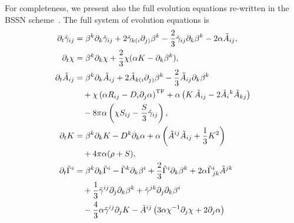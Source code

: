 For completeness, we present also the full evolution equations re-written in the BSSN scheme~\cite{Scalar_Shibata:1995we,Scalar_Baumgarte:1998te}.
The full system of evolution equations is
\begin{subequations}
  \allowdisplaybreaks
  \label{eq:bssn}
  \begin{align}
    \partial_t \tilde{\gamma}_{ij} & = \beta^k \partial_k \tilde{\gamma}_{ij} +
    2\tilde{\gamma}_{k(i} \partial_{j)} \beta^k - \frac{2}{3}
    \tilde{\gamma}_{ij} \partial_k \beta^k -2\alpha \tilde{A}_{ij},  \\
    \partial_t \chi & = \beta^k \partial_k \chi + \frac{2}{3} \chi (\alpha K
    - \partial_k \beta^k),  \\
    \partial_t \tilde{A}_{ij} & = \beta^k \partial_k \tilde{A}_{ij}
      + 2\tilde{A}_{k(i} \partial_{j)} \beta^k
      - \frac{2}{3} \tilde{A}_{ij} \partial_k \beta^k  \notag \\
      & \quad + \chi \left( \alpha R_{ij} - D_i \partial_j \alpha\right)^{\rm
      TF}
      + \alpha \left( K\,\tilde{A}_{ij}
      - 2 \tilde{A}_i{}^k \tilde{A}_{kj} \right) \notag \\
      & \quad - 8 \pi \alpha \left(
          \chi S_{ij} - \frac{S}{3} \tilde \gamma_{ij}
        \right), \\
    \partial_t K & = \beta^k \partial_k K - D^k \partial_k \alpha + \alpha \left(
                   \tilde{A}^{ij} \tilde{A}_{ij} + \frac{1}{3} K^2 \right) \notag \\
    & \quad  + 4 \pi \alpha (\rho + S), \\
    \partial_t \tilde{\Gamma}^i & = \beta^k \partial_k \tilde{\Gamma}^i
       - \tilde{\Gamma}^k \partial_k \beta^i + \frac{2}{3}
    \tilde{\Gamma}^i \partial_k \beta^k + 2 \alpha \tilde{\Gamma}^i_{jk}
                                  \tilde{A}^{jk} \notag \\
                                  & \quad + \frac{1}{3} \tilde{\gamma}^{ij}\partial_j \partial_k
    \beta^k
    + \tilde{\gamma}^{jk} \partial_j \partial_k \beta^i \nonumber \\
    & \quad - \frac{4}{3} \alpha \tilde{\gamma}^{ij} \partial_j K -
    \tilde{A}^{ij} \left( 3 \alpha \chi^{-1} \partial_j \chi + 2\partial_j
      \alpha \right) %

\end{align}
\end{subequations}
